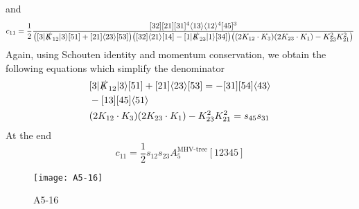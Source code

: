 and
\begin{equation*}
c_{11} = \frac{1}{2}\frac{[32][21][31]^4\langle 13\rangle\langle 12 \rangle^4 [45]^3}{\big( [3|\slashed{K}_{12}|3\rangle [51] + [21]\langle 23\rangle [53]\big)
\big( [32]\langle 21\rangle[14] - [1|\slashed{K}_{23}|1\rangle[34]\big)
\big( (2K_{12}\cdot K_3)(2K_{23}\cdot K_1) - K_{23}^2K_{21}^2\big)
}
\end{equation*}
Again, using Schouten identity and momentum conservation, we obtain the following equations which simplify the denominator
\begin{equation*}
\begin{split}
& [3|\slashed{K}_{12}|3\rangle [51] + [21]\langle 23\rangle [53] = -[31][54]\langle 43 \rangle 
\\
& -[13][45]\langle 51 \rangle
\\
&
(2K_{12}\cdot K_3)(2K_{23}\cdot K_1) - K_{23}^2K_{21}^2 = s_{45}s_{31}
\end{split}
\end{equation*}
At the end
\begin{equation*}
c_{11} = \frac{1}{2}s_{12}s_{23}A_5^{\textrm{MHV-tree}}[12345]
\end{equation*}
%
%
\begin{figure}
  \centering
    \texttt{[image: A5-16]}
    \caption{A5-16}
  \label{A5-16}
\end{figure}
